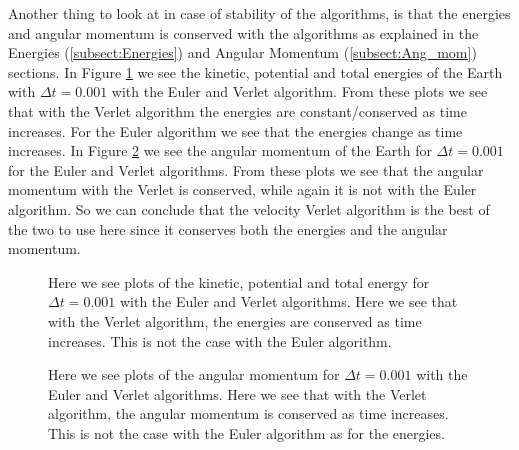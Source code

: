 \documentclass[12pt,a4paper,english]{article}
\begin{document}
Another thing to look at in case of stability of the algorithms, is that the energies and angular momentum is conserved with the algorithms as explained in the Energies (\ref{subsect:Energies}) and Angular Momentum (\ref{subsect:Ang_mom}) sections. In Figure \ref{fig:Energies} we see the kinetic, potential and total energies of the Earth with $\Delta t=0.001$ with the Euler and Verlet algorithm. From these plots we see that with the Verlet algorithm the energies are constant/conserved as time increases. For the Euler algorithm we see that the energies change as time increases. In Figure \ref{fig:Angular} we see the angular momentum of the Earth for $\Delta t=0.001$ for the Euler and Verlet algorithms. From these plots we see that the angular momentum with the Verlet is conserved, while again it is not with the Euler algorithm. So we can conclude that the velocity Verlet algorithm is the best of the two to use here since it conserves both the energies and the angular momentum.

\begin{figure}[htbp]
	\hspace{0.5em}
	\caption{Here we see plots of the kinetic, potential and total energy for $\Delta t=0.001$ with the Euler and Verlet algorithms. Here we see that with the Verlet algorithm, the energies are conserved as time increases. This is not the case with the Euler algorithm. \label{fig:Energies}}
\end{figure}

\begin{figure}[htbp]
	\hspace{0.5em}
	\caption{Here we see plots of the angular momentum for $\Delta t=0.001$ with the Euler and Verlet algorithms. Here we see that with the Verlet algorithm, the angular momentum is conserved as time increases. This is not the case with the Euler algorithm as for the energies. \label{fig:Angular}}
\end{figure}
\end{document}
